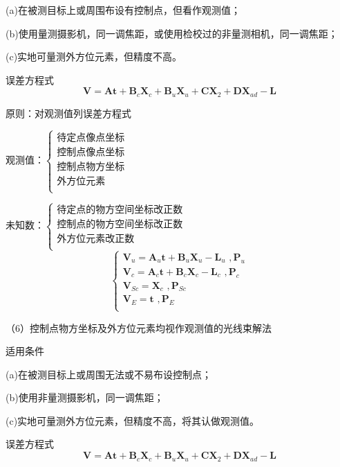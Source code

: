 \documentclass[a4paper]{ctexart}
\begin{document}
(a)在被测目标上或周围布设有控制点，但看作观测值；

(b)使用量测摄影机，同一调焦距，或使用检校过的非量测相机，同一调焦距；

(c)实地可量测外方位元素，但精度不高。

误差方程式
$$
\boldsymbol{V}=\boldsymbol{At}+\boldsymbol{B}_c\boldsymbol{X}_c+\boldsymbol{B}_u\boldsymbol{X}_u+\boldsymbol{CX}_2+\boldsymbol{DX}_{ad}-\boldsymbol{L}
$$

原则：对观测值列误差方程式

观测值：$\begin{cases}
	\text{待定点像点坐标}\\
	\text{控制点像点坐标}\\
	\text{控制点物方坐标}\\
	\text{外方位元素}\\
\end{cases}$

未知数：$\begin{cases}
	\text{待定点的物方空间坐标改正数}\\
	\text{控制点的物方空间坐标改正数}\\
	\text{外方位元素改正数}\\
\end{cases}$
$$
\begin{cases}
	\boldsymbol{V}_u=\boldsymbol{A}_u\boldsymbol{t}+\boldsymbol{B}_u\boldsymbol{X}_u-\boldsymbol{L}_u\,\,, \boldsymbol{P}_u\\
	\boldsymbol{V}_c=\boldsymbol{A}_c\boldsymbol{t}+\boldsymbol{B}_c\boldsymbol{X}_c-\boldsymbol{L}_c\,\,, \boldsymbol{P}_c\\
	\boldsymbol{V}_{Sc}=\boldsymbol{X}_c\,\,, \boldsymbol{P}_{Sc}\\
	\boldsymbol{V}_E=\boldsymbol{t}\,\,, \boldsymbol{P}_E\\
\end{cases}
$$

（6）控制点物方坐标及外方位元素均视作观测值的光线束解法

适用条件

(a)在被测目标上或周围无法或不易布设控制点；

(b)使用非量测摄影机，同一调焦距；

(c)实地可量测外方位元素，但精度不高，将其认做观测值。

误差方程式
$$
\boldsymbol{V}=\boldsymbol{At}+\boldsymbol{B}_c\boldsymbol{X}_c+\boldsymbol{B}_u\boldsymbol{X}_u+\boldsymbol{CX}_2+\boldsymbol{DX}_{ad}-\boldsymbol{L}
$$
\end{document}
